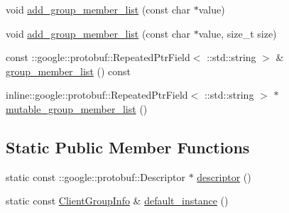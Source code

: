 \begin{DoxyCompactItemize}
\item 
void \hyperlink{class_i_m_1_1_base_define_1_1_client_group_info_afff6d29231cd162464097f9397121bea}{add\+\_\+group\+\_\+member\+\_\+list} (const char $\ast$value)
\item 
void \hyperlink{class_i_m_1_1_base_define_1_1_client_group_info_adfb6441071c85342c8a909a8f825f1db}{add\+\_\+group\+\_\+member\+\_\+list} (const char $\ast$value, size\+\_\+t size)
\item 
const \+::google\+::protobuf\+::\+Repeated\+Ptr\+Field$<$ \+::std\+::string $>$ \& \hyperlink{class_i_m_1_1_base_define_1_1_client_group_info_a8f0a5e87d542b68e793f636db8e792b4}{group\+\_\+member\+\_\+list} () const 
\item 
inline\+::google\+::protobuf\+::\+Repeated\+Ptr\+Field$<$ \+::std\+::string $>$ $\ast$ \hyperlink{class_i_m_1_1_base_define_1_1_client_group_info_aadb1b00b354a27f3d0a3eb66acd94df8}{mutable\+\_\+group\+\_\+member\+\_\+list} ()
\end{DoxyCompactItemize}
\subsection*{Static Public Member Functions}
\begin{DoxyCompactItemize}
\item 
static const \+::google\+::protobuf\+::\+Descriptor $\ast$ \hyperlink{class_i_m_1_1_base_define_1_1_client_group_info_a2c97a316e89d3f10e374620ac3587057}{descriptor} ()
\item 
static const \hyperlink{class_i_m_1_1_base_define_1_1_client_group_info}{Client\+Group\+Info} \& \hyperlink{class_i_m_1_1_base_define_1_1_client_group_info_a3440322bc3919ef2d941d5eaa95bd8ce}{default\+\_\+instance} ()
\end{DoxyCompactItemize}
